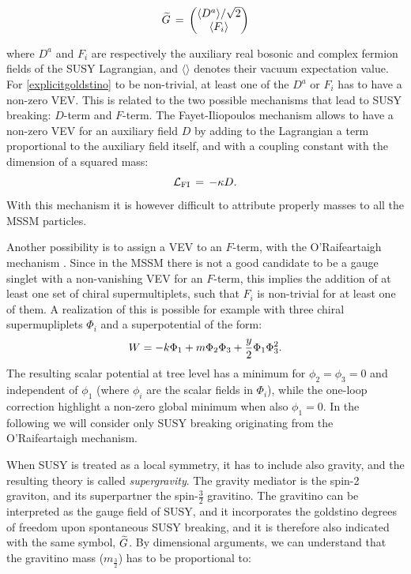 \begin{equation}
 \widetilde{G} \,=\, 
 \begin{pmatrix}
\langle D^a \rangle /\sqrt{2} \cr \langle F_i\rangle 
\end{pmatrix}
\label{explicitgoldstino}
\end{equation} 

where $D^a$ and $F_i$ are respectively the auxiliary real bosonic and complex fermion fields of the SUSY Lagrangian, and $\langle \rangle $ denotes their vacuum expectation value. For \ref{explicitgoldstino} to be non-trivial, at least one of the $D^a$ or $F_i$ has to have a non-zero VEV. This is related to the two possible mechanisms that lead to SUSY breaking: $D$-term and $F$-term. 
The Fayet-Iliopoulos mechanism \cite{Fayet:1974jb} allows to have a non-zero VEV for an auxiliary field $D$ by adding to the Lagrangian a term proportional to the auxiliary field itself, and with a coupling constant with the dimension of a squared mass:
\begin{equation}
\mathcal{L}_{\rm FI} \,=\, -\kappa D .
\end{equation}
With this mechanism it is however difficult to attribute properly masses to all the MSSM particles.

Another possibility is to assign a VEV to an $F$-term, with the O’Raifeartaigh mechanism \cite{ORaifeartaigh:1975nky}. Since in the MSSM there is not a good candidate to be a gauge singlet with a non-vanishing VEV for an $F$-term, this implies the addition of at least one set of chiral supermultiplets, such that $F_i$ is non-trivial for at least one of them. A realization of this is possible for example with three chiral supermupliplets $\Phi_i$ and a superpotential of the form:
\begin{equation}
W = -k \Phi_1 + m \Phi_2 \Phi_3 + {y\over 2} \Phi_1 \Phi_3^2 .
\label{oraif}
\end{equation}
The resulting scalar potential at tree level has a minimum for $\phi_2=\phi_3=0$ and independent of $\phi_1$ (where $\phi_i$ are the scalar fields in $\Phi_i$), while the one-loop correction highlight a non-zero global minimum when also $\phi_1=0$. In the following we will consider only SUSY breaking originating from the O’Raifeartaigh mechanism.


When SUSY is treated as a local symmetry, it has to include also gravity, and the resulting theory is called \textit{supergravity}. The gravity mediator is the spin-2 graviton, and its superpartner the spin-$\frac{3}{2}$ gravitino. The gravitino can be interpreted as the gauge field of SUSY, and it incorporates the goldstino degrees of freedom upon spontaneous SUSY breaking, and it is therefore also indicated with the same symbol, $\widetilde{G}$. By dimensional arguments, we can understand that the gravitino mass ($m_{\frac{3}{2}}$) has to be proportional to:

